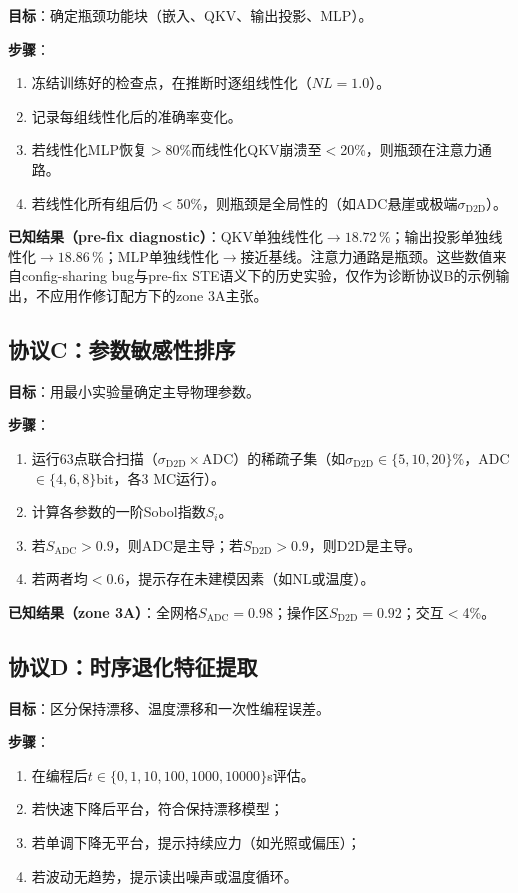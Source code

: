 \textbf{目标}：确定瓶颈功能块（嵌入、QKV、输出投影、MLP）。

\textbf{步骤}：
\begin{enumerate}
    \item 冻结训练好的检查点，在推断时逐组线性化（$NL=1.0$）。
    \item 记录每组线性化后的准确率变化。
    \item 若线性化MLP恢复$>$80\%而线性化QKV崩溃至$<$20\%，则瓶颈在注意力通路。
    \item 若线性化所有组后仍$<$50\%，则瓶颈是全局性的（如ADC悬崖或极端$\sigma_{\mathrm{D2D}}$）。
\end{enumerate}

\textbf{已知结果（pre-fix diagnostic）}：QKV单独线性化$\rightarrow18.72\,\%$；输出投影单独线性化$\rightarrow18.86\,\%$；MLP单独线性化$\rightarrow$接近基线。注意力通路是瓶颈。这些数值来自config-sharing bug与pre-fix STE语义下的历史实验，仅作为诊断协议B的示例输出，不应用作修订配方下的zone 3A主张。

\subsection{协议C：参数敏感性排序}
\label{subsec:protocol_c}

\textbf{目标}：用最小实验量确定主导物理参数。

\textbf{步骤}：
\begin{enumerate}
    \item 运行63点联合扫描（$\sigma_{\mathrm{D2D}}\times$ADC）的稀疏子集（如$\sigma_{\mathrm{D2D}}\in\{5,10,20\}\%$，ADC$\in\{4,6,8\}$bit，各3 MC运行）。
    \item 计算各参数的一阶Sobol指数$S_i$。
    \item 若$S_{\mathrm{ADC}}>0.9$，则ADC是主导；若$S_{\mathrm{D2D}}>0.9$，则D2D是主导。
    \item 若两者均$<$0.6，提示存在未建模因素（如NL或温度）。
\end{enumerate}

\textbf{已知结果（zone 3A）}：全网格$S_{\mathrm{ADC}}=0.98$；操作区$S_{\mathrm{D2D}}=0.92$；交互$<$4\%。

\subsection{协议D：时序退化特征提取}
\label{subsec:protocol_d}

\textbf{目标}：区分保持漂移、温度漂移和一次性编程误差。

\textbf{步骤}：
\begin{enumerate}
    \item 在编程后$t\in\{0,1,10,100,1000,10000\}$s评估。
    \item 若快速下降后平台，符合保持漂移模型；
    \item 若单调下降无平台，提示持续应力（如光照或偏压）；
    \item 若波动无趋势，提示读出噪声或温度循环。
\end{enumerate}


